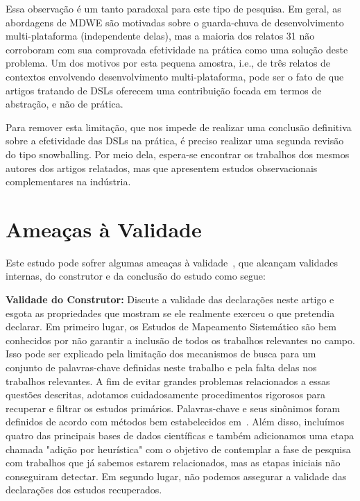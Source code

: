 Essa observação é um tanto paradoxal para este tipo de pesquisa. Em geral, as abordagens de MDWE são motivadas sobre o guarda-chuva de desenvolvimento multi-plataforma (independente delas), mas a maioria dos relatos 31 não corroboram com sua comprovada efetividade na prática como uma solução deste problema. Um dos motivos por esta pequena amostra, i.e., de três relatos de contextos envolvendo desenvolvimento multi-plataforma, pode ser o fato de que artigos tratando de DSLs oferecem uma contribuição focada em termos de abstração, e não de prática. 

Para remover esta limitação, que nos impede de realizar uma conclusão definitiva sobre a efetividade das DSLs na prática, é preciso realizar uma segunda revisão do tipo snowballing. Por meio dela, espera-se encontrar os trabalhos dos mesmos autores dos artigos relatados, mas que apresentem estudos observacionais complementares na indústria. %



\section{Ameaças à Validade}
\label{sec:threats}

Este estudo pode sofrer algumas ameaças à validade~\cite{Wohlin12}, que alcançam validades internas, do construtor e da conclusão do estudo como segue:


\textbf{Validade do Construtor:} 
Discute a validade das declarações neste artigo e esgota as propriedades que mostram se ele realmente exerceu o que pretendia declarar. Em primeiro lugar, os Estudos de Mapeamento Sistemático são bem conhecidos por não garantir a inclusão de todos os trabalhos relevantes no campo. Isso pode ser explicado pela limitação dos mecanismos de busca para um conjunto de palavras-chave definidas neste trabalho e pela falta delas nos trabalhos relevantes. A fim de evitar grandes problemas relacionados a essas questões descritas, adotamos cuidadosamente procedimentos rigorosos para recuperar e filtrar os estudos primários. Palavras-chave e seus sinônimos foram definidos de acordo com métodos bem estabelecidos em~\cite{Kitchenham07}. Além disso, incluímos quatro das principais bases de dados científicas e também adicionamos uma etapa chamada "adição por heurística" com o objetivo de contemplar a fase de pesquisa com trabalhos que já sabemos estarem relacionados, mas as etapas iniciais não conseguiram detectar. Em segundo lugar, não podemos assegurar a validade das declarações dos estudos recuperados.%

